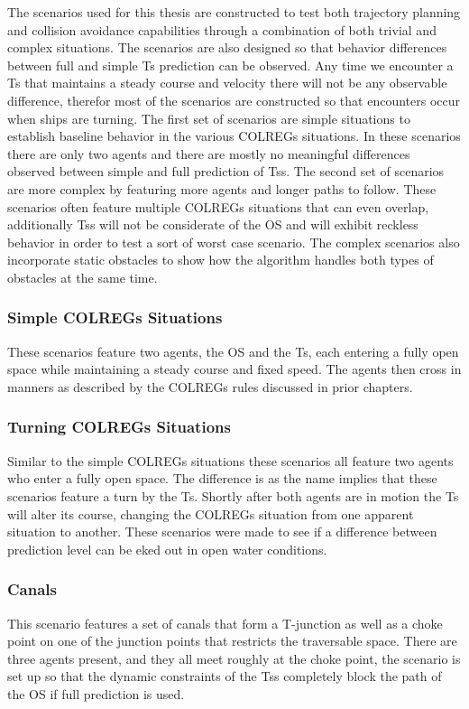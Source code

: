 The scenarios used for this thesis are constructed to test both trajectory planning and collision avoidance capabilities through
a combination of both trivial and complex situations. The scenarios are also designed so that behavior differences between
full and simple \gls{Ts} prediction can be observed. Any time we encounter a \gls{Ts} that maintains a steady course and
velocity there will not be any observable difference, therefor most of the scenarios are constructed so that encounters occur
when ships are turning.
The first set of scenarios are simple situations to establish baseline behavior in the various \gls{COLREGs} situations. In these scenarios there are only 
two agents and there are mostly no meaningful differences observed between simple and full prediction of \gls{Ts}s. 
The second set of scenarios are more complex by featuring more agents and longer paths to follow. These scenarios often feature multiple \gls{COLREGs} situations that can
even overlap, additionally \gls{Ts}s will not be considerate of the \gls{OS} and will exhibit reckless behavior in order to test a sort of worst case scenario.
The complex scenarios also incorporate static obstacles to show how the algorithm handles both types of obstacles at the same time.

\subsubsection*{Simple COLREGs Situations}
These scenarios feature two agents, the \gls{OS} and the \gls{Ts}, each entering a fully open space while maintaining a
steady course and fixed speed. The agents then cross in manners as described by the \gls{COLREGs} rules discussed in prior chapters.


\subsubsection*{Turning COLREGs Situations}
Similar to the simple \gls{COLREGs} situations these scenarios all feature two agents who enter a fully open space. The difference
is as the name implies that these scenarios feature a turn by the \gls{Ts}. Shortly after both agents are in motion the \gls{Ts}
will alter its course, changing the COLREGs situation from one apparent situation to another. These scenarios were made to see if
a difference between prediction level can be eked out in open water conditions. 

\subsubsection*{Canals}
This scenario features a set of canals that form a T-junction as well as a choke point on one of the junction points that restricts
the traversable space. There are three agents present, and they all meet roughly at the choke point, the scenario is set up so that
the dynamic constraints of the \gls{Ts}s completely block the path of the \gls{OS} if full prediction is used.

